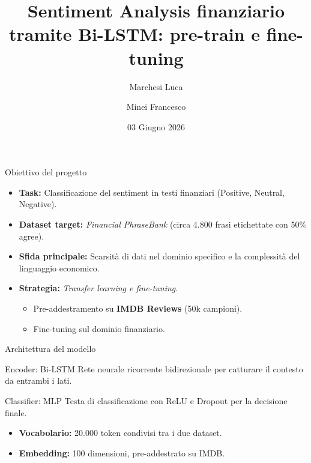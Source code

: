 \documentclass{beamer}
\title[Sentiment Analysis Bi-LSTM]{Sentiment Analysis finanziario tramite Bi-LSTM: pre-train e fine-tuning}
\author[Marchesi, Minei]{Marchesi Luca \and Minei Francesco}
\institute[UniPR]{Università di Parma \\ Laboratorio di Fondamenti di AI}
\date{03 Giugno 2026}
\begin{document}
\begin{frame}
    \titlepage
\end{frame}

\begin{frame}{Obiettivo del progetto}
    \begin{itemize}
        \item \textbf{Task:} Classificazione del sentiment in testi finanziari (Positive, Neutral, Negative).
        \item \textbf{Dataset target:} \textit{Financial PhraseBank} (circa 4.800 frasi etichettate con 50\% agree).
        \item \textbf{Sfida principale:} Scarsità di dati nel dominio specifico e la complessità del linguaggio economico.
        \item \textbf{Strategia:} \textit{Transfer learning e fine-tuning}.
              \begin{itemize}
                  \item Pre-addestramento su \textbf{IMDB Reviews} (50k campioni).
                  \item Fine-tuning sul dominio finanziario.
              \end{itemize}
    \end{itemize}
\end{frame}

\begin{frame}{Architettura del modello}
    \begin{block}{Encoder: Bi-LSTM}
        Rete neurale ricorrente bidirezionale per catturare il contesto da entrambi i lati.
    \end{block}
    \begin{block}{Classifier: MLP}
        Testa di classificazione con ReLU e Dropout per la decisione finale.
    \end{block}
    \begin{itemize}
        \item \textbf{Vocabolario:} 20.000 token condivisi tra i due dataset.
        \item \textbf{Embedding:} 100 dimensioni, pre-addestrato su IMDB.
    \end{itemize}
\end{frame}
\end{document}
